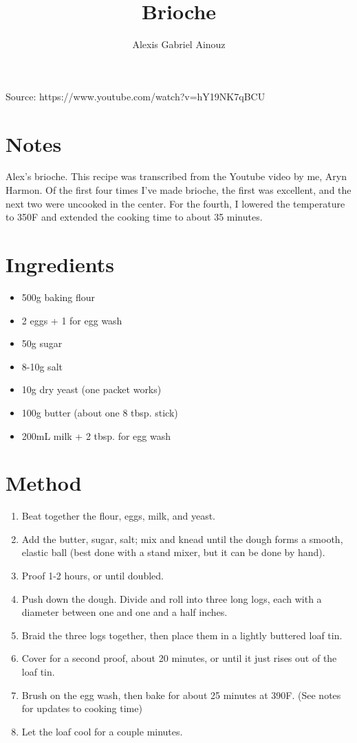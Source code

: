 \documentclass[12pt]{article}
\author{Alexis Gabriel Ainouz}
\title{Brioche}
\date{}
\begin{document}
\begin{multicols*}{2}
\maketitle

Source: https://www.youtube.com/watch?v=hY19NK7qBCU

\section{Notes}

Alex's brioche. This recipe was transcribed from the Youtube video by me, Aryn Harmon. Of the first four times I've made brioche, the first was excellent, and the next two were uncooked in the center. For the fourth, I lowered the temperature to 350F and extended the cooking time to about 35 minutes.

\section{Ingredients}

\begin{itemize}
    \item 500g baking flour
    \item 2 eggs + 1 for egg wash
    \item 50g sugar
    \item 8-10g salt
    \item 10g dry yeast (one packet works)
    \item 100g butter (about one 8 tbsp. stick)
    \item 200mL milk + 2 tbsp. for egg wash
\end{itemize}

\section{Method}

\begin{enumerate}
    \item Beat together the flour, eggs, milk, and yeast.
    \item Add the butter, sugar, salt; mix and knead until the dough forms a smooth, elastic ball (best done with a stand mixer, but it can be done by hand).
    \item Proof 1-2 hours, or until doubled.
    \item Push down the dough. Divide and roll into three long logs, each with a diameter between one and one and a half inches.
    \item Braid the three logs together, then place them in a lightly buttered loaf tin.
    \item Cover for a second proof, about 20 minutes, or until it just rises out of the loaf tin.
    \item Brush on the egg wash, then bake for about 25 minutes at 390F. (See notes for updates to cooking time)
    \item Let the loaf cool for a couple minutes.
\end{enumerate}

\end{multicols*}
\end{document}
